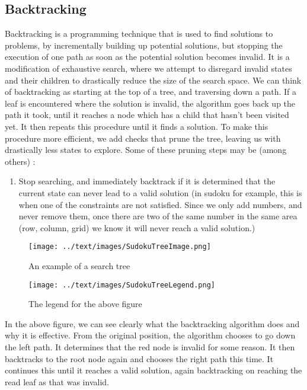 \documentclass[16pt]{article}
\begin{document}
\subsection{Backtracking}
Backtracking is a programming technique that is used to find solutions to problems, by incrementally building up potential solutions, but stopping the execution of one path as soon as the potential solution becomes invalid. 
It is a modification of exhaustive search, where we attempt to disregard invalid states and their children to drastically reduce the size of the search space.
\newline
\newline
We can think of backtracking as starting at the top of a tree, and traversing down a path. 
If a leaf is encountered where the solution is invalid, the algorithm goes back up the path it took, until it reaches a node which has a child that hasn't been visited yet. It then repeats this procedure until it finds a solution. \cite{algorithms_book}
To make this procedure more efficient, we add checks that prune the tree, leaving us with drastically less states to explore.
\newline
Some of these pruning steps may be (among others) \cite{algorithms_book}:
\begin{enumerate}
    \item Stop searching, and immediately backtrack if it is determined that the current state can never lead to a valid solution (in sudoku for example, this is when one of the constraints are not satisfied. Since we only add numbers, and never remove them, once there are two of the same number in the same area (row, column, grid) we know it will never reach a valid solution.)
\end{enumerate}

\begin{figure}[H]
    \texttt{[image: ../text/images/SudokuTreeImage.png]}
    \caption{An example of a search tree \cite{hackernoon_backtracking}}
    \centering
    \texttt{[image: ../text/images/SudokuTreeLegend.png]}
    \caption{The legend for the above figure \cite{hackernoon_backtracking}}
\end{figure}

In the above figure, we can see clearly what the backtracking algorithm does and why it is effective.
From the original position, the algorithm chooses to go down the left path. It determines that the red node is invalid for some reason. It then backtracks to the root node again and chooses the right path this time.
It continues this until it reaches a valid solution, again backtracking on reaching the read leaf as that was invalid.
\end{document}
